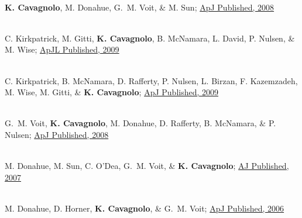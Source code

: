 \documentclass[11pt]{cv}
\begin{document}
\begin{llist}
{}\\
{\bf K. Cavagnolo}, M. Donahue, G.~M. Voit, \& M. Sun; \href{http://adsabs.harvard.edu/abs/2008ApJ...682..821C}{ApJ Published, 2008}

{}\\
C. Kirkpatrick, M. Gitti, {\bf K. Cavagnolo}, B. McNamara, L. David, P. Nulsen, \& M. Wise; \href{http://adsabs.harvard.edu/abs/2009arXiv0909.2252K}{ApJL Published, 2009}

{}\\
C. Kirkpatrick, B. McNamara, D. Rafferty, P. Nulsen, L. Birzan, F. Kazemzadeh, M. Wise, M. Gitti, \& {\bf K. Cavagnolo}; \href{http://adsabs.harvard.edu/abs/2009ApJ...697..867K}{ApJ Published, 2009}

{}\\
G.~M. Voit, {\bf K. Cavagnolo}, M. Donahue, D. Rafferty, B. McNamara, \& P. Nulsen; \href{http://adsabs.harvard.edu/abs/2008ApJ...681L...5V}{ApJ Published, 2008}

{}\\
M. Donahue, M. Sun, C. O'Dea, G.~M. Voit, \& {\bf K. Cavagnolo}; \href{http://adsabs.harvard.edu/abs/2007AJ....134...14D}{AJ Published, 2007}

{}\\
M. Donahue, D. Horner, {\bf K. Cavagnolo}, \& G.~M. Voit; \href{http://adsabs.harvard.edu/abs/2006ApJ...643..730D}{ApJ Published, 2006}

\end{llist}
\end{document}
